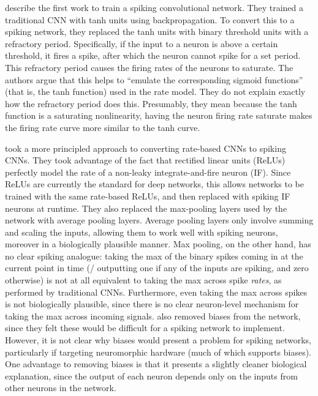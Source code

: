 \textcite{Perez-Carrasco2010} describe the first work to train a spiking convolutional network.
They trained a traditional CNN with tanh units using backpropagation.
To convert this to a spiking network,
they replaced the tanh units with binary threshold units
with a refractory period.
Specifically, if the input to a neuron is above a certain threshold,
it fires a spike,
after which the neuron cannot spike for a set period.
This refractory period causes the firing rates of the neurons to saturate.
The authors argue that this helps to ``emulate the corresponding sigmoid functions''
(that is, the tanh function) used in the rate model.
They do not explain exactly how the refractory period does this.
Presumably, they mean because the tanh function is a saturating nonlinearity,
having the neuron firing rate saturate makes the firing rate curve
more similar to the tanh curve.


\textcite{Cao2014} took a more principled approach to converting
rate-based CNNs to spiking CNNs.
They took advantage of the fact that rectified linear units (ReLUs)
perfectly model the rate of a non-leaky integrate-and-fire neuron (IF).
Since ReLUs are currently the standard for deep networks,
this allows networks to be trained with the same rate-based ReLUs,
and then replaced with spiking IF neurons at runtime.
They also replaced the max-pooling layers used by the network
with average pooling layers.
Average pooling layers only involve summing and scaling the inputs,
allowing them to work well with spiking neurons,
moreover in a biologically plausible manner.
Max pooling, on the other hand, has no clear spiking analogue:
taking the max of the binary spikes coming in at the current point in time
(\ie/ outputting one if any of the inputs are spiking, and zero otherwise)
is not at all equivalent to taking the max across spike \emph{rates},
as performed by traditional CNNs.
Furthermore, even taking the max across spikes is not biologically plausible,
since there is no clear neuron-level mechanism for taking the max
across incoming signals.
\textcite{Cao2014} also removed biases from the network,
since they felt these would be difficult for a spiking network to implement.
However, it is not clear why biases would present a problem for spiking networks,
particularly if targeting neuromorphic hardware (much of which supports biases).
One advantage to removing biases is that it presents a slightly cleaner biological explanation,
since the output of each neuron depends only on the inputs from other neurons in the network.

